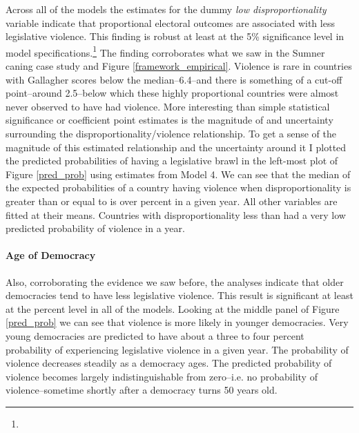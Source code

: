 \documentclass[a4paper]{article}\usepackage[]{graphicx}\usepackage[]{color}
\begin{document}
Across all of the models the estimates for the dummy {\emph{low disproportionality}} variable indicate that proportional electoral outcomes are associated with less legislative violence. This finding is robust at least at the 5\% significance level in  model specifications.\footnote{} The finding corroborates what we saw in the Sumner caning case study and Figure \ref{framework_empirical}. Violence is rare in countries with Gallagher scores below the median--6.4--and there is something of a cut-off point--around 2.5--below which these highly proportional countries were almost never observed to have had violence. More interesting than simple statistical significance or coefficient point estimates is the magnitude of and uncertainty surrounding the disproportionality/violence relationship. To get a sense of the magnitude of this estimated relationship and the uncertainty around it I plotted the predicted probabilities of having a legislative brawl in the left-most plot of Figure \ref{pred_prob} using estimates from Model 4. We can see that the median of the expected probabilities of a country having violence when disproportionality is greater than or equal to  is  over  percent in a given year. All other variables are fitted at their means. Countries with disproportionality less than  had a very low predicted probability of violence in a year.

\paragraph{Age of Democracy}

Also, corroborating the evidence we saw before, the analyses indicate that older democracies tend to have less legislative violence. This result is significant at least at the  percent level in all of the models. Looking at the middle panel of Figure \ref{pred_prob} we can see that violence is more likely in younger democracies. Very young democracies are predicted to have about a three to four percent probability of experiencing legislative violence in a given year. The probability of violence decreases steadily as a democracy ages. The predicted probability of violence becomes largely indistinguishable from zero--i.e. no probability of violence--sometime shortly after a democracy turns 50 years old.
\end{document}
